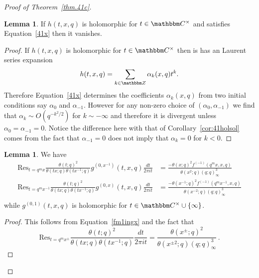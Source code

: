 \documentclass[12pt,reqno]{amsart}
\theoremstyle{definition}
\newtheorem{lemma}[theorem]{Lemma}
\def\BZ{\mathbbm Z}
\def\BC{\mathbbm C}
\def\Res{\mathrm{Res}}
\def\a{\alpha}
\def\be{\begin{equation}}
\def\ee{\end{equation}}
\begin{document}
\begin{proof}[Proof of Theorem~\ref{thm.41c}]
\begin{lemma}
  \label{lem.41.x.holsol}
  If $h(t,x,q)$ is holomorphic for $t\in\BC^{\times}$ and satisfies
  Equation~\eqref{41x} then it vanishes.
\end{lemma}

\begin{proof}
  If $h(t,x,q)$ is holomorphic for $t\in\BC^{\times}$ then is has an Laurent
  series expansion
\be
h(t,x,q)=\sum_{k\in\BZ}\a_{k}(x,q)t^{k}.
\ee
Therefore Equation~\eqref{41x} determines the coefficients $\a_{k}(x,q)$ from
two initial conditions say $\a_{0}$ and $\a_{-1}$. However for any non-zero choice
of $(\a_{0},\a_{-1})$ we find that $\a_{k}\sim O(q^{-k^{2}/2})$ for $k\sim-\infty$
and therefore it is divergent unless $\a_{0}=\a_{-1}=0$. Notice the difference here
with that of Corollary~\ref{cor:41holsol} comes from the fact that $\a_{-1}=0$ does
not imply that $\a_{k}=0$ for $k<0$.
\end{proof}
  
\begin{lemma}
  \label{lem.41.gx}
We have
\be
\begin{aligned}
  \Res_{t=q^{m}x}\frac{\theta(t;q)^{2}}{\theta(tx;q)
\theta(tx^{-1};q)}g^{(0,x^{-1})}(t,x,q)\frac{dt}{2\pi i t}
  &=
  \frac{-\theta(x;q)^2f^{(-1)}(q^{m}x,x,q)}{\theta(x^{2};q)(q;q)_{\infty}^{3}}\\
  \Res_{t=q^{m}x^{-1}}\frac{\theta(t;q)^{2}}{\theta(tx;q)
\theta(tx^{-1};q)}g^{(0,x)}(t,x,q)\frac{dt}{2\pi i t} 
  &=
  \frac{-\theta(x^{-1};q)^2f^{(-1)}(q^{m}x^{-1},x,q)}{
    \theta(x^{-2};q)(q;q)_{\infty}^{3}}\\
\end{aligned}
\ee
while $g^{(0,1)}(t,x,q)$ is holomorphic for $t\in\BC^{\times}\cup\{\infty\}$.
\end{lemma}

\begin{proof}
This follows from Equation~\eqref{fm1ingx} and the fact that
\be
\Res_{t=q^{m}x^{\pm}}\frac{\theta(t;q)^{2}}{\theta(tx;q)
\theta(tx^{-1};q)}\frac{dt}{2\pi i t}
=
\frac{\theta(x^{\pm};q)^2}{\theta(x^{\pm2};q)(q;q)_{\infty}^3}\,.
\ee
\end{proof}


\end{proof}
\end{document}
